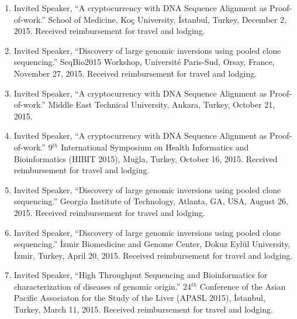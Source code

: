 
\begin{enumerate}
\item
  Invited Speaker,
  ``A cryptocurrency with DNA Sequence Alignment as Proof-of-work.''
  School of Medicine, Ko\c{c} University, \.{I}stanbul, Turkey, December 2, 2015.
  Received reimbursement for travel and lodging.
\item
  Invited Speaker, 
  ``Discovery of large genomic inversions using pooled clone sequencing.''
  SeqBio2015 Workshop, Université Paris-Sud, Orsay, France, November 27, 2015.
  Received reimbursement for travel and lodging.
\item
  Invited Speaker,
  ``A cryptocurrency with DNA Sequence Alignment as Proof-of-work.''
  Middle East Technical University, Ankara, Turkey, October 21, 2015.
\item
  Invited Speaker,
  ``A cryptocurrency with DNA Sequence Alignment as Proof-of-work.''
  9$^{th}$ International Symposium on Health Informatics and Bioinformatics (HIBIT 2015),
   Muğla, Turkey, October 16, 2015. Received reimbursement for travel and lodging.
\item
  Invited Speaker, 
  ``Discovery of large genomic inversions using pooled clone sequencing.''
  Georgia Institute of Technology, Atlanta, GA, USA, August 26, 2015. Received reimbursement for travel and lodging.
\item
  Invited Speaker, 
  ``Discovery of large genomic inversions using pooled clone sequencing.''
  İzmir Biomedicine and Genome Center, Dokuz Eylül University, İzmir, Turkey, April 20, 2015. Received reimbursement for travel and lodging.
\item
  Invited Speaker, 
  ``High Throughput Sequencing and Bioinformatics for characterization of diseases of genomic origin.''
  24$^{th}$ Conference of the Asian Pacific Associaton for the Study of the Liver (APASL 2015), İstanbul, Turkey, March 11, 2015. Received reimbursement for travel and lodging.

\end{enumerate}
